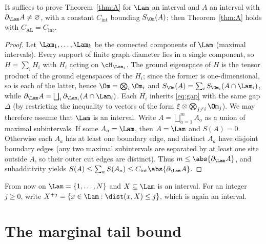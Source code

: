 \begin{lemma}[Reductions]\label{lem:reductions}
It suffices to prove Theorem~\ref{thm:A} for $\Lam$ an interval and $A$
an interval with $\partial_\Lam A\ne\varnothing$, with a constant
$C_{\mathrm{int}}$ bounding $S_\Om(A)$; then Theorem~\ref{thm:A} holds
with $C_{\mathrm{AL}}=C_{\mathrm{int}}$.
\end{lemma}
\begin{proof}
Let $\Lam_1,\dots,\Lam_k$ be the connected components of $\Lam$ (maximal
intervals). Every support of finite graph diameter lies in a single
component, so $H=\sum_iH_i$ with $H_i$ acting on $\cH_{\Lam_i}$. The
ground eigenspace of $H$ is the tensor product of the ground eigenspaces
of the $H_i$; since the former is one-dimensional, so is each of the
latter, hence $\Om=\bigotimes_i\Om_i$ and
$S_\Om(A)=\sum_iS_{\Om_i}(A\cap\Lam_i)$, while
$\partial_\Lam A=\bigsqcup_i\partial_{\Lam_i}(A\cap\Lam_i)$. Each $H_i$
inherits \eqref{eq:gap} with the same gap $\Delta$ (by restricting the
inequality to vectors of the form $\xi\otimes\bigotimes_{j\ne i}\Om_j$).
We may therefore assume that $\Lam$ is an interval. Write
$A=\bigsqcup_{a=1}^mA_a$ as a union of maximal subintervals. If some
$A_a=\Lam$, then $A=\Lam$ and $S(A)=0$. Otherwise each $A_a$ has at least
one boundary edge, and distinct $A_a$ have disjoint boundary edges (any
two maximal subintervals are separated by at least one site outside $A$,
so their outer cut edges are distinct). Thus $m\le\abs{\partial_\Lam A}$,
and subadditivity yields
$S(A)\le\sum_aS(A_a)\le C_{\mathrm{int}}\abs{\partial_\Lam A}$.
\end{proof}

From now on $\Lam=\{1,\dots,N\}$ and $X\subseteq\Lam$ is an interval. For
an integer $j\ge0$, write $X^{+j}=\{x\in\Lam:\dist(x,X)\le j\}$, which is
again an interval.

\section{The marginal tail bound}\label{sec:tail}

